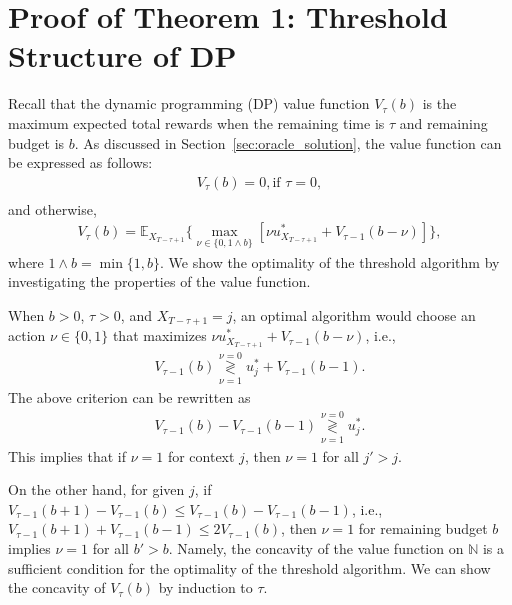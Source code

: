 \section{Proof of Theorem 1: Threshold Structure of DP}\label{app:proof_opt_threshold_struct}
Recall that the dynamic programming (DP) value function $V_{\tau}(b)$ is the maximum expected total rewards when the remaining time is $\tau$ and remaining budget is $b$. As discussed in Section~\ref{sec:oracle_solution}, the value function can be expressed as follows:
\begin{eqnarray}
V_{\tau}(b) = 0,  \text{if $\tau = 0$}, \nonumber \\
\end{eqnarray}
and otherwise,
\begin{eqnarray}
V_{\tau}(b) =
\mathbb{E}_{X_{T - \tau+1}}\big\{\max_{\nu \in \{0, 1\land b\}} [\nu u_{X_{T - \tau+1}}^* + V_{\tau-1}(b - \nu)] \big\}, \nonumber
\end{eqnarray}
where $1 \land b = \min\{1,b\}$. We show the optimality of the threshold algorithm by investigating the properties of the value function.

When $b > 0$, $\tau > 0$, and $X_{T- \tau+1} = j$, an optimal algorithm would choose an action $\nu \in \{0, 1\}$ that maximizes $\nu u_{X_{T - \tau+1}}^* + V_{\tau-1}(b - \nu)$, i.e.,
\begin{eqnarray}
V_{\tau -1}(b) \underset{\nu = 1}{\overset{\nu = 0}{\gtrless}} u_j^* + V_{\tau-1}(b - 1).
\end{eqnarray}
The above criterion can be rewritten as
\begin{eqnarray}
V_{\tau-1}(b) - V_{\tau-1}(b - 1)\underset{\nu = 1}{\overset{\nu = 0}{\gtrless}} u_j^*.
\end{eqnarray}
This implies that if $\nu = 1$ for context $j$, then $\nu = 1$ for all $j' > j$.

On the other hand, for given $j$, if $V_{\tau-1}(b+1) - V_{\tau-1}(b) \leq V_{\tau-1}(b) - V_{\tau-1}(b - 1)$, i.e., $V_{\tau-1}(b+1) + V_{\tau-1}(b - 1) \leq 2V_{\tau-1}(b)$, then  $\nu = 1$ for remaining budget $b$ implies $\nu = 1$ for all $b' > b$. Namely, the concavity of the value function on $\mathbb{N}$ is a sufficient condition for the optimality of the threshold algorithm. We can show the concavity of $V_{\tau}(b)$ by induction to $\tau$.

